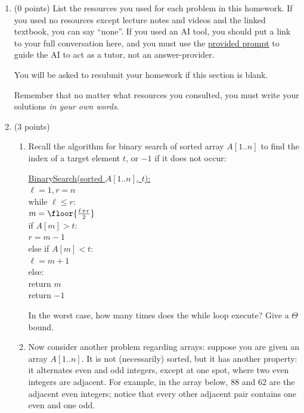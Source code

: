 \documentclass[11pt]{article}
\begin{document}


\begin{enumerate}


\item (0 points) List the resources you used for each problem in this homework. If you used no resources except
lecture notes and videos and the linked textbook, you can say ``none''. If you used
an AI tool, you should put a link to your full conversation here, and you must
use the
\href{https://umaal.org/files/teaching/csci332_fall2026/agents.md}{provided
prompt}
 to guide the AI to act
as a tutor, not an answer-provider.

You will be asked to resubmit your homework if this section is blank.

Remember that no matter what resources you consulted, you must write your solutions
\emph{in your own words}.

\item (3 points) 
\begin{enumerate}
    \item
Recall the algorithm for binary search of sorted array $A[1..n]$
to find the index of a target element $t$, or $-1$ if it does not occur:

\begin{algo}
    \underline{BinarySearch(sorted $A[1..n]$, $t$):}\+ \\
    $\ell = 1, r = n$\\
    while $\ell \leq r$: \+ \\
    $m = \floor{\frac{\ell + r}{2}}$\\
    if $A[m] > t$: \+ \\
    $r = m - 1$ \- \\
    else if $A[m] < t$:  \+ \\
    $\ell = m + 1$ \-\\
    else: \+ \\
    return $m$\- \- \- \\
    return $-1$
\end{algo}

In the worst case, how many times does the while loop execute? Give a $\Theta$ bound.

\item

    Now consider another problem regarding arrays: suppose you are given an array
    $A[1..n]$. It is not (necessarily) sorted, but it has another property: it alternates
    even and odd integers, except at one spot, where two even integers are adjacent.
    For example, in the array below, $88$ and $62$ are the adjacent even integers;
    notice that every other adjacent pair contains one even and one odd.


\end{enumerate}
\end{enumerate}
\end{document}
